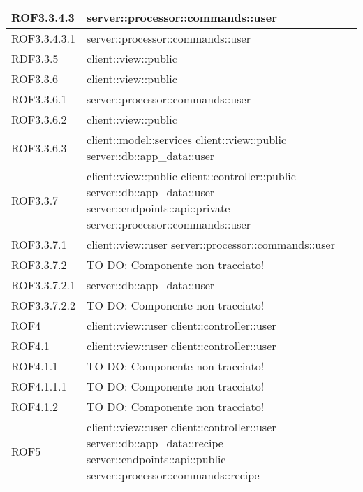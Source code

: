 \begin{center}
\begin{longtable}{| p{4cm} | p{8cm} |}
\hline
ROF3.3.4.3 & server::processor::commands::user \\
\hline
ROF3.3.4.3.1 & server::processor::commands::user \\
\hline
RDF3.3.5 & client::view::public \\
\hline
ROF3.3.6 & client::view::public \\
\hline
ROF3.3.6.1 & server::processor::commands::user \\
\hline
ROF3.3.6.2 & client::view::public \\
\hline
ROF3.3.6.3 & client::model::services \newline client::view::public \newline server::db::app\_data::user \\
\hline
ROF3.3.7 & client::view::public \newline client::controller::public \newline server::db::app\_data::user \newline server::endpoints::api::private \newline server::processor::commands::user \\
\hline
ROF3.3.7.1 & client::view::user \newline server::processor::commands::user \\
\hline
ROF3.3.7.2 & TO DO: Componente non tracciato! \\
\hline
ROF3.3.7.2.1 & server::db::app\_data::user \\
\hline
ROF3.3.7.2.2 & TO DO: Componente non tracciato! \\
\hline
ROF4 & client::view::user \newline client::controller::user \\
\hline
ROF4.1 & client::view::user \newline client::controller::user \\
\hline
ROF4.1.1 & TO DO: Componente non tracciato! \\
\hline
ROF4.1.1.1 & TO DO: Componente non tracciato! \\
\hline
ROF4.1.2 & TO DO: Componente non tracciato! \\
\hline
ROF5 & client::view::user \newline client::controller::user \newline server::db::app\_data::recipe \newline server::endpoints::api::public \newline server::processor::commands::recipe \\

\end{longtable}
\end{center}

